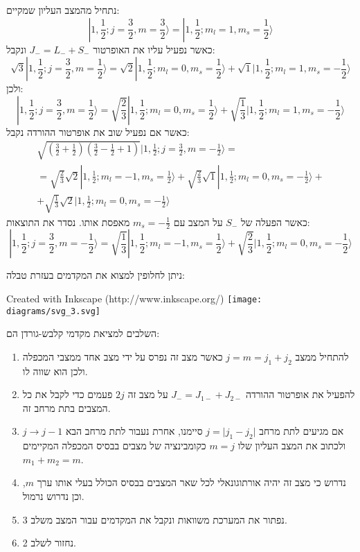 \documentclass{tstextbook}
\begin{document}
\begin{example}[חיבור תנ"ז \(s=\frac{1}{2}\) עם \(l=1\)]
נתחיל מהמצב העליון שמקיים:
$$|1,{\frac{1}{2}};j={\frac{3}{2}},m={\frac{3}{2}}\rangle=|1,{\frac{1}{2}};m_{l}=1,m_{s}={\frac{1}{2}}\rangle$$
כאשר נפעיל עליו את האופרטור \(J_{-}=L_{-}+S_{-}\) ונקבל:
$$\sqrt{3}|1,\frac{1}{2};j=\frac{3}{2},m=\frac{1}{2}\rangle=\sqrt{2}|1,\frac{1}{2};m_{l}=0,m_{s}=\frac{1}{2}\rangle+\sqrt{1}|1,\frac{1}{2};m_{l}=1,m_{s}=-\frac{1}{2}\rangle$$
ולכן:
$$|1,{\frac{1}{2}};j={\frac{3}{2}},m={\frac{1}{2}}\rangle={\sqrt{\frac{2}{3}}}|1,{\frac{1}{2}};m_{l}=0,m_{s}={\frac{1}{2}}\rangle+{\sqrt{\frac{1}{3}}}|1,{\frac{1}{2}};m_{l}=1,m_{s}=-{\frac{1}{2}}\rangle$$
כאשר אם נפעיל שוב את אופרטור ההורדה נקבל:
$$\begin{gather}{\sqrt{\left({\frac{3}{2}}+{\frac{1}{2}}\right)\left({\frac{3}{2}}-{\frac{1}{2}}+1\right)}}|1,{\frac{1}{2}};j={\frac{3}{2}},m=-{\frac{1}{2}}\rangle=\\ =\sqrt{\frac{2}{3}}\sqrt{2}|1,\frac{1}{2};m_{l}=-1,m_{s}=\frac{1}{2}\rangle+\sqrt{\frac{2}{3}}\sqrt{1}|1,\frac{1}{2};m_{l}=0,m_{s}=-\frac{1}{2}\rangle+ \\+\sqrt{\frac{1}{3}}\sqrt{2}|1,\frac{1}{2};m_{l}=0,m_{s}=-\frac{1}{2}\rangle 
\end{gather}$$
כאשר הפעלה של \(S_{-}\) על המצב עם \(m_{s}=-\frac{1}{2}\) מאפסת אותו. נסדר את התוצאות:
$$|1,{\frac{1}{2}};j={\frac{3}{2}},m=-{\frac{1}{2}}\rangle={\sqrt{\frac{1}{3}}}|1,{\frac{1}{2}};m_{l}=-1,m_{s}={\frac{1}{2}}\rangle+{\sqrt{\frac{2}{3}}}|1,{\frac{1}{2}};m_{l}=0,m_{s}=-{\frac{1}{2}}\rangle$$

\end{example}
ניתן לחלופין למצוא את המקדמים בעזרת טבלה:

 Created with Inkscape (http://www.inkscape.org/) \texttt{[image: diagrams/svg\_3.svg]}
\begin{summary}
השלבים למציאת מקדמי קלבש-גורדן הם:

  \begin{enumerate}
    \item להתחיל ממצב \(j=m=j_{1}+j_{2}\) כאשר מצב זה נפרס על ידי מצב אחד ממצבי המכפלה ולכן הוא שווה לו. 


    \item להפעיל את אופרטור ההורדה \(J_{-}=J_{1-}+J_{2-}\) על מצב זה \(2j\) פעמים כדי לקבל את כל המצבים בתת מרחב זה. 


    \item אם מגיעים לתת מרחב \(j=\lvert j_{1}-j_{2} \rvert\) סיימנו, אחרת נעבור לתת מרחב הבא \(j\to j-1\) ולכתוב את המצב העליון שלו \(m=j\) כקומבינציה של מצבים בבסיס המכפלה המקיימים \(m_{1}+m_{2}=m\). 


    \item נדרוש כי מצב זה יהיה אורתוגונאלי לכל שאר המצבים בבסיס הכולל בעלי אותו ערך \(m\), וכן נדרוש נרמול. 


    \item נפתור את המערכת משוואות ונקבל את המקדמים עבור המצב משלב 3. 


    \item נחזור לשלב 2. 


  \end{enumerate}
\end{summary}
\end{document}
